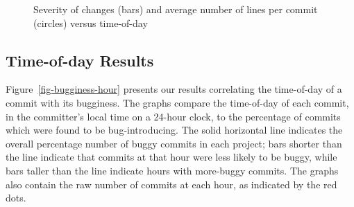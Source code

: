 \begin{figure}[tbh]
\centering
{}
\caption{\label{fig-severity-hour}Severity of changes (bars) and average number
  of lines per commit (circles) versus time-of-day}
\end{figure}

\subsection{Time-of-day Results} 
\label{sec-time-of-day}

Figure~\ref{fig-bugginess-hour} presents our results correlating the time-of-day
of a commit with its bugginess.  The graphs compare the time-of-day of each
commit, in the committer's local time on a 24-hour clock, to the percentage of
commits which were found to be bug-introducing. The solid horizontal line
indicates the overall percentage number of buggy commits in each project; bars
shorter than the line indicate that commits at that hour were less likely to be
buggy, while bars taller than the line indicate hours with more-buggy
commits. The graphs also contain the raw number of commits at each hour, as
indicated by the red dots.

